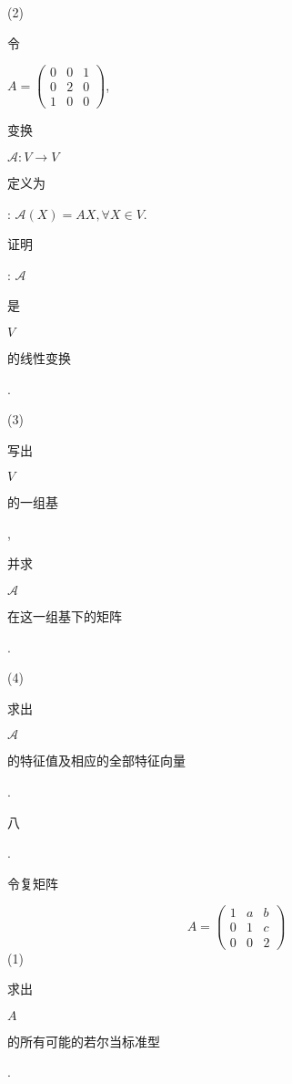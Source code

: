 \documentclass[10pt]{article}
\begin{document}
(2) \begin{CJK}{UTF8}{mj}令\end{CJK} $A=\left(\begin{array}{lll}0 & 0 & 1 \\ 0 & 2 & 0 \\ 1 & 0 & 0\end{array}\right)$, \begin{CJK}{UTF8}{mj}变换\end{CJK} $\mathscr{A}: V \rightarrow V$ \begin{CJK}{UTF8}{mj}定义为\end{CJK}: $\mathscr{A}(X)=A X, \forall X \in V$. \begin{CJK}{UTF8}{mj}证明\end{CJK}: $\mathscr{A}$ \begin{CJK}{UTF8}{mj}是\end{CJK} $V$ \begin{CJK}{UTF8}{mj}的线性变换\end{CJK}.

(3) \begin{CJK}{UTF8}{mj}写出\end{CJK} $V$ \begin{CJK}{UTF8}{mj}的一组基\end{CJK}, \begin{CJK}{UTF8}{mj}并求\end{CJK} $\mathscr{A}$ \begin{CJK}{UTF8}{mj}在这一组基下的矩阵\end{CJK}.

(4) \begin{CJK}{UTF8}{mj}求出\end{CJK} $\mathscr{A}$ \begin{CJK}{UTF8}{mj}的特征值及相应的全部特征向量\end{CJK}. \begin{CJK}{UTF8}{mj}八\end{CJK}. \begin{CJK}{UTF8}{mj}令复矩阵\end{CJK}
$$
A=\left(\begin{array}{ccc}
1 & a & b \\
0 & 1 & c \\
0 & 0 & 2
\end{array}\right)
$$
(1) \begin{CJK}{UTF8}{mj}求出\end{CJK} $A$ \begin{CJK}{UTF8}{mj}的所有可能的若尔当标准型\end{CJK}.
\end{document}
